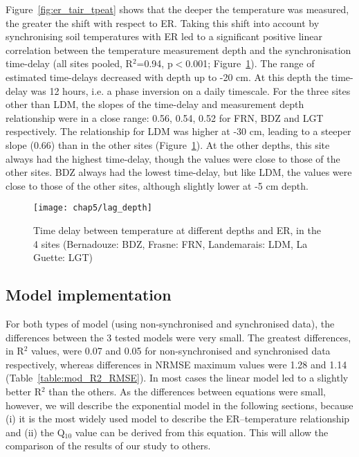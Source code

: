 Figure~\ref{fig:er_tair_tpeat} shows that the deeper the temperature was measured, the greater the shift with respect to ER.
Taking this shift into account by synchronising soil temperatures with ER led to a significant positive linear correlation between the temperature measurement depth and the synchronisation time-delay (all sites pooled, R$^2$=0.94, p$<$0.001; Figure~\ref{fig:lag_depth}).
The range of estimated time-delays decreased with depth up to -20 cm.
At this depth the time-delay was 12 hours, i.e. a phase inversion on a daily timescale.
For the three sites other than LDM, the slopes of the time-delay and measurement depth relationship were in a close range: 0.56, 0.54, 0.52 for FRN, BDZ and LGT respectively.
The relationship for LDM was higher at -30 cm, leading to a steeper slope (0.66) than in the other sites (Figure~\ref{fig:lag_depth}).
At the other depths, this site always had the highest time-delay, though the values were close to those of the other sites.
BDZ always had the lowest time-delay, but like LDM, the values were close to those of the other sites, although slightly lower at -5 cm depth.

\begin{figure}[h]
\centering
\texttt{[image: chap5/lag\_depth]}
\caption{Time delay between temperature at different depths and ER, in the 4 sites (Bernadouze: BDZ, Frasne: FRN, Landemarais: LDM, La Guette: LGT)}
\label{fig:lag_depth}
\end{figure}

\subsection{Model implementation}

For both types of model (using non-synchronised and synchronised data), the differences between the 3 tested models were very small. 
The greatest differences, in R$^{2}$ values, were 0.07 and 0.05 for non-synchronised and synchronised data respectively, whereas differences in NRMSE maximum values were 1.28 and 1.14 (Table~\ref{table:mod_R2_RMSE}).
In most cases the linear model led to a slightly better R$^2$ than the others.
As the differences between equations were small, however, we will describe the exponential model in the following sections, because (i) it is the most widely used model to describe the ER--temperature relationship and (ii) the Q$_{10}$ value can be derived from this equation. 
This will allow the comparison of the results of our study to others.

